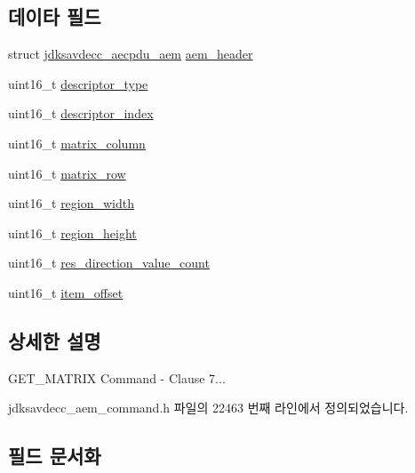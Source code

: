 \subsection*{데이타 필드}
\begin{DoxyCompactItemize}
\item 
struct \hyperlink{structjdksavdecc__aecpdu__aem}{jdksavdecc\+\_\+aecpdu\+\_\+aem} \hyperlink{structjdksavdecc__aem__command__get__matrix_ae1e77ccb75ff5021ad923221eab38294}{aem\+\_\+header}
\item 
uint16\+\_\+t \hyperlink{structjdksavdecc__aem__command__get__matrix_ab7c32b6c7131c13d4ea3b7ee2f09b78d}{descriptor\+\_\+type}
\item 
uint16\+\_\+t \hyperlink{structjdksavdecc__aem__command__get__matrix_a042bbc76d835b82d27c1932431ee38d4}{descriptor\+\_\+index}
\item 
uint16\+\_\+t \hyperlink{structjdksavdecc__aem__command__get__matrix_aa7db0d3d8cd5b895d1f9bf81b816fd66}{matrix\+\_\+column}
\item 
uint16\+\_\+t \hyperlink{structjdksavdecc__aem__command__get__matrix_a8cb269dcca919ec8232ec33a09477c07}{matrix\+\_\+row}
\item 
uint16\+\_\+t \hyperlink{structjdksavdecc__aem__command__get__matrix_a87453b735ebc871f58f507139df28b89}{region\+\_\+width}
\item 
uint16\+\_\+t \hyperlink{structjdksavdecc__aem__command__get__matrix_afac2ca21b44ee4f90b555f2609321c60}{region\+\_\+height}
\item 
uint16\+\_\+t \hyperlink{structjdksavdecc__aem__command__get__matrix_a0f34ba05787e5027402de5f250c3a5a6}{res\+\_\+direction\+\_\+value\+\_\+count}
\item 
uint16\+\_\+t \hyperlink{structjdksavdecc__aem__command__get__matrix_afbb15486d86fc9c3680a6864ddbc029b}{item\+\_\+offset}
\end{DoxyCompactItemize}


\subsection{상세한 설명}
G\+E\+T\+\_\+\+M\+A\+T\+R\+IX Command -\/ Clause 7... 

jdksavdecc\+\_\+aem\+\_\+command.\+h 파일의 22463 번째 라인에서 정의되었습니다.



\subsection{필드 문서화}
